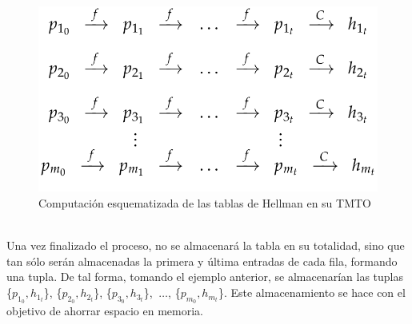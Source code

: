 \documentclass[12pt,spanish,listoffigures,listoftables]{tfgetsinf}
\begin{document}

\begin{figure}[H]
    \centering
    \includegraphics[scale = 0.38]{tabla.png}
    \caption{Computación esquematizada de las tablas de Hellman en su TMTO}
    \label{tabla}
\end{figure}
~\\

Una vez finalizado el proceso, no se almacenará la tabla en su totalidad, sino que tan sólo serán almacenadas la primera y última entradas de cada fila, formando una tupla. De tal forma, tomando el ejemplo anterior, se almacenarían las tuplas \{$p_{1_0}, h_{1_t}$\}, \{$p_{2_0}, h_{2_t}$\}, \{$p_{3_0}, h_{3_t}$\}, $~\dots$, \{$p_{m_0}, h_{m_t}$\}. Este almacenamiento se hace con el objetivo de ahorrar espacio en memoria.
\end{document}
